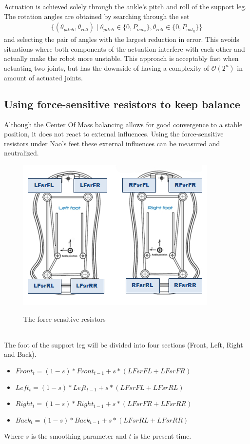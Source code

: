 \documentclass[a4paper]{article}
\begin{document}
Actuation is achieved solely through the ankle's pitch and roll of the support
leg. The rotation angles are obtained by searching through the set
\begin{align*}
  \{ (\theta_{pitch}, \theta_{roll}) \mid \theta_{pitch} \in \{0, P_{out_{x}}\},
  \theta_{roll} \in \{0, P_{out_{y}}\} \}
\end{align*}
and selecting the pair of angles with the largest reduction in error. This
avoids situations where both components of the actuation interfere with
each other and actually make the robot more unstable. This approach is acceptably
fast when actuating two joints, but has the downside of having a complexity of
$\mathcal{O}(2^n)$ in amount of actuated joints.

\subsection{Using force-sensitive resistors to keep balance}

Although the Center Of Mass balancing allows for good convergence to a
stable position, it does not react to external influences.
Using the force-sensitive resistors under Nao's feet these external influences can be measured and neutralized.
\begin{figure}[htb]
	\centering
	\includegraphics[scale=0.75]{pics/naosfeet.jpg}
	\label{fig:fsr_plot}
	\caption{The force-sensitive resistors}
\end{figure}\\
The foot of the support leg will be divided into four sections (Front, Left, Right and Back). 
\begin{itemize}
    \item $Front_t = (1-s) * Front_{t-1} + s * (LFsrFL + LFsrFR)$
    \item $Left_t = (1-s) * Left_{t-1} + s *(LFsrFL + LFsrRL)$
    \item $Right_t = (1-s) * Right_{t-1} + s *(LFsrFR + LFsrRR)$
    \item $Back_t = (1-s) * Back_{t-1} + s *(LFsrRL + LFsrRR)$ 
\end{itemize}
Where $s$ is the smoothing parameter and $t$ is the present time.
\end{document}
